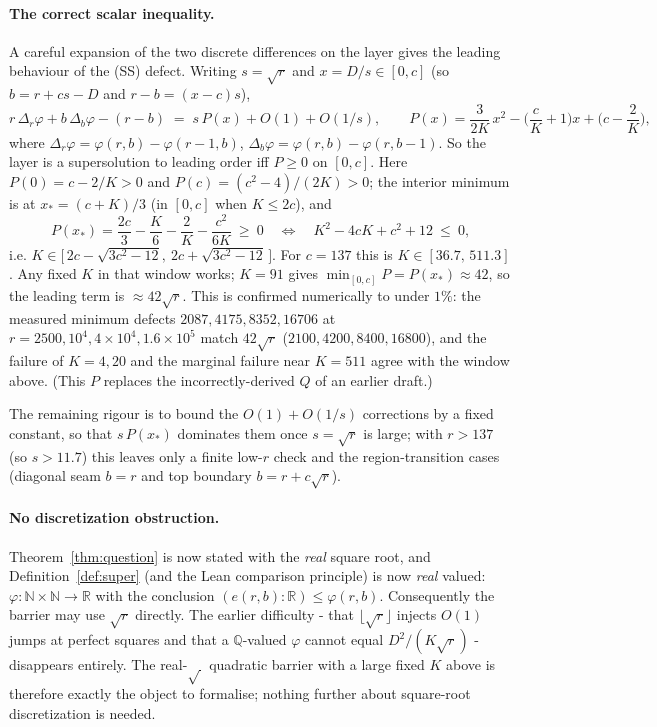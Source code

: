 \documentclass{article}
\begin{document}
\paragraph{The correct scalar inequality.}
A careful expansion of the two discrete differences on the layer gives the leading
behaviour of the (SS) defect. Writing $s=\sqrt r$ and $x=D/s\in[0,c]$ (so
$b=r+cs-D$ and $r-b=(x-c)s$),
\[
  r\,\Delta_r\varphi+b\,\Delta_b\varphi-(r-b)\;=\;s\,P(x)+O(1)+O(1/s),
  \qquad
  P(x)=\frac{3}{2K}\,x^2-\Big(\frac cK+1\Big)x+\Big(c-\frac2K\Big),
\]
where $\Delta_r\varphi=\varphi(r,b)-\varphi(r-1,b)$, $\Delta_b\varphi=\varphi(r,b)-
\varphi(r,b-1)$. So the layer is a supersolution to leading order iff $P\ge0$ on
$[0,c]$. Here $P(0)=c-2/K>0$ and $P(c)=(c^2-4)/(2K)>0$; the interior minimum is at
$x_*=(c+K)/3$ (in $[0,c]$ when $K\le2c$), and
\[
  P(x_*)=\frac{2c}{3}-\frac K6-\frac2K-\frac{c^2}{6K}\ \ge\ 0
  \quad\Longleftrightarrow\quad
  K^2-4cK+c^2+12\ \le\ 0,
\]
i.e. $K\in\big[\,2c-\sqrt{3c^2-12},\ 2c+\sqrt{3c^2-12}\,\big]$. For $c=137$ this is
$K\in[36.7,\,511.3]$. Any fixed $K$ in that window works; $K=91$ gives
$\min_{[0,c]}P=P(x_*)\approx42$, so the leading term is $\approx42\sqrt r$. This is
confirmed numerically to under $1\%$: the measured minimum defects
$2087,4175,8352,16706$ at $r=2500,10^4,4\times10^4,1.6\times10^5$ match
$42\sqrt r$ ($2100,4200,8400,16800$), and the failure of $K=4,20$ and the marginal
failure near $K=511$ agree with the window above. (This $P$ replaces the
incorrectly-derived $Q$ of an earlier draft.)

The remaining rigour is to bound the $O(1)+O(1/s)$ corrections by a fixed constant,
so that $s\,P(x_*)$ dominates them once $s=\sqrt r$ is large; with $r>137$ (so
$s>11.7$) this leaves only a finite low-$r$ check and the region-transition cases
(diagonal seam $b=r$ and top boundary $b=r+c\sqrt r$).

\paragraph{No discretization obstruction.}
Theorem~\ref{thm:question} is now stated with the \emph{real} square root, and
Definition~\ref{def:super} (and the Lean comparison principle) is now \emph{real}
valued: $\varphi:\mathbb N\times\mathbb N\to\mathbb R$ with the conclusion
$(e(r,b):\mathbb R)\le\varphi(r,b)$. Consequently the barrier may use $\sqrt r$
directly. The earlier difficulty - that $\lfloor\sqrt r\rfloor$ injects $O(1)$ jumps
at perfect squares and that a $\mathbb Q$-valued $\varphi$ cannot equal
$D^2/(K\sqrt r)$ - disappears entirely. The real-$\sqrt{\,}$ quadratic barrier with a
large fixed $K$ above is therefore exactly the object to formalise; nothing further
about square-root discretization is needed.
\end{document}
